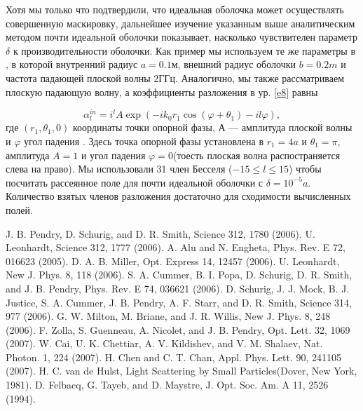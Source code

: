 \documentclass[a4paper, 12pt]{article}
\begin{document}
Хотя мы только что подтвердили, что идеальная оболочка может осуществлять совершенную маскировку, дальнейшее изучение
указанным выше аналитическим методом почти идеальной оболочки показывает, насколько чувствителен параметр $\delta$ к 
производительности оболочки. Как пример мы используем те же параметры в \cite{6}, в которой внутренний радиус $a=0.1м$,
внешний радиус оболочки $b=0.2m$ и частота падающей плоской волны $2ГГц$. Аналогично, мы также рассматриваем плоскую
падающую волну, а коэффициенты разложения в ур. \eqref{e8} равны
 
\begin{equation}
	\alpha_l^{in} = i^l A \exp(-ik_0r_1\cos(\varphi+\theta_1)-il\varphi),
\end{equation}
где $(r_1, \theta_1, 0)$ координаты точки опорной фазы, А --- амплитуда плоской волны и $\varphi$ угол падения \cite{13}.
Здесь точка опорной фазы установлена в $r_1=4a$ и $\theta_1=\pi$, амплитуда $A=1$ и угол падения $\varphi=0$(тоесть 
плоская волна распостраняется слева на право). Мы использовали 31 член Бесселя ($-15 \le l \le 15$) чтобы посчитать
рассеянное поле для почти идеальной оболочки с $\delta=10^{-5}a$. Количество взятых членов разложения достаточно для
сходимости вычисленных полей.

\begin{thebibliography}{99}
J. B. Pendry, D. Schurig, and D. R. Smith, Science 312, 1780 (2006).
U. Leonhardt, Science 312, 1777 (2006).
A. Alu and N. Engheta, Phys. Rev. E 72, 016623 (2005).
D. A. B. Miller, Opt. Express 14, 12457 (2006).
U. Leonhardt, New J. Phys. 8, 118 (2006).
S. A. Cummer, B. I. Popa, D. Schurig, D. R. Smith, and J. B. Pendry, Phys. Rev. E 74, 036621 (2006).
D. Schurig, J. J. Mock, B. J. Justice, S. A. Cummer, J. B. Pendry, A. F. Starr, and D. R. Smith, 
Science 314, 977 (2006).
G. W. Milton, M. Briane, and J. R. Willis, New J. Phys. 8, 248 (2006).
F. Zolla, S. Guenneau, A. Nicolet, and J. B. Pendry, Opt. Lett. 32, 1069 (2007).
W. Cai, U. K. Chettiar, A. V. Kildishev, and V. M. Shalaev, Nat. Photon. 1, 224 (2007).
H. Chen and C. T. Chan, Appl. Phys. Lett. 90, 241105 (2007).
H. C. van de Hulst, Light Scattering by Small Particles(Dover, New York, 1981).
D. Felbacq, G. Tayeb, and D. Maystre, J. Opt. Soc. Am. A 11, 2526 (1994).
\end{thebibliography}
\end{document}
